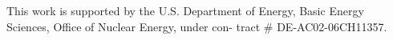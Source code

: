 This work is supported by the U.S. Department of Energy, Basic Energy Sciences, 
Office of Nuclear Energy, under con- tract # DE-AC02-06CH11357.
